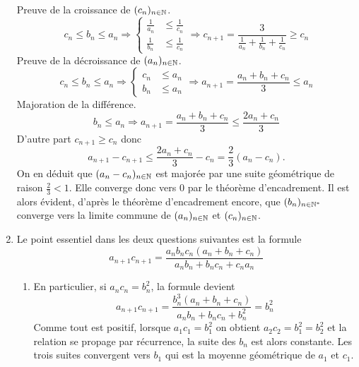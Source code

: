 \begin{enumerate}
Preuve de la croissance de $(c_n)_{n\in\mathbb{N}}$.
\begin{displaymath}
 c_n \leq b_n \leq a_n \Rightarrow
\left\lbrace 
\begin{aligned}
 \frac{1}{a_n} &\leq \frac{1}{c_n}\\
 \frac{1}{b_n} &\leq \frac{1}{c_n}
\end{aligned}
\right. 
\Rightarrow
c_{n+1}= \frac{3}{\frac{1}{a_n}+\frac{1}{b_n}+\frac{1}{c_n}} \geq c_n 
\end{displaymath}
Preuve de la décroissance de $(a_n)_{n\in\mathbb{N}}$.
\begin{displaymath}
 c_n \leq b_n \leq a_n \Rightarrow
\left\lbrace 
\begin{aligned}
 c_n &\leq a_n\\
 b_n &\leq a_n
\end{aligned}
\right. 
\Rightarrow
a_{n+1}= \frac{a_n+b_n+c_n}{3} \leq a_n 
\end{displaymath}
Majoration de la différence.
\begin{displaymath}
 b_n\leq a_n \Rightarrow a_{n+1} = \frac{a_n+b_n+c_n}{3} \leq \frac{2a_n+c_n}{3}
\end{displaymath}
D'autre part $c_{n+1}\geq c_n$ donc
\[
 a_{n+1} - c_{n+1} \leq \frac{2a_n + c_n}{3} - c_n = \frac{2}{3}(a_n - c_n).
\]
On en déduit que $(a_n - c_n)_{n\in\mathbb{N}}$ est majorée par une suite géométrique de raison $\frac{2}{3}  < 1$. Elle converge donc vers $0$ par le théorème d'encadrement.\newline
Il est alors évident, d'après le théorème d'encadrement encore, que $(b_n)_{n\in\mathbb{N}^*}$ converge vers la limite commune de $(a_n)_{n\in\mathbb{N}}$ et $(c_n)_{n\in\mathbb{N}}$.

\item 
Le point essentiel dans les deux questions suivantes est la formule
\begin{equation}
 a_{n+1}c_{n+1} = \frac{a_nb_nc_n(a_n+b_n+c_n)}{a_nb_n+b_nc_n+c_na_n}
\end{equation}
 \begin{enumerate} \item En particulier, si $a_nc_n=b_n^2$, la formule devient
\begin{displaymath}
 a_{n+1}c_{n+1} = \frac{b_n^3(a_n+b_n+c_n)}{a_nb_n+b_nc_n+b_n^2}=b_n^2 
\end{displaymath}
Comme tout est positif, lorsque $a_1c_1=b_1^2$ on obtient $a_2c_2=b_1^2=b_2^2$ et la relation se propage par récurrence, la suite des $b_n$ est alors constante. Les trois suites convergent vers $b_1$ qui est la moyenne géométrique de $a_1$ et $c_1$.


\end{enumerate}
\end{enumerate}
